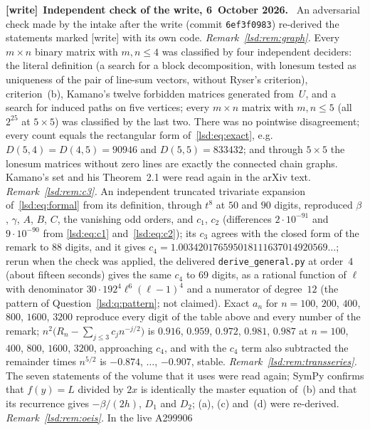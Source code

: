 \documentclass[11pt]{article}
\theoremstyle{remark}\newtheorem{remark}{Remark}
\newcommand{\file}[1]{\nolinkurl{#1}}
\newenvironment{writenote}[1][]{\par\smallskip\begingroup\small
 \noindent\textbf{[write]}\if\relax\detokenize{#1}\relax\else~\textbf{#1.}\fi\ }%
 {\par\endgroup\smallskip}
\begin{document}
\begin{writenote}[Independent check of the write, 6~October 2026]
An adversarial check made by the intake after the write (commit
\file{6ef3f0983}) re-derived the statements marked [write] with its own code.
\emph{Remark~\ref{lsd:rem:graph}.} Every $m\times n$ binary matrix with
$m,n\le4$ was classified by four independent deciders: the literal definition
(a search for a block decomposition, with lonesum tested as uniqueness of the
pair of line-sum vectors, without Ryser's criterion), criterion~(b), Kamano's
twelve forbidden matrices generated from~$U$, and a search for induced paths
on five vertices; every $m\times n$ matrix with $m,n\le5$ (all $2^{25}$ at
$5\times5$) was classified by the last two. There was no pointwise
disagreement; every count equals the rectangular form
of~\eqref{lsd:eq:exact}, e.g.\ $D(5,4)=D(4,5)=90946$ and $D(5,5)=833432$; and
through $5\times5$ the lonesum matrices without zero lines are exactly the
connected chain graphs. Kamano's set and his Theorem~2.1 were read again in
the arXiv text. \emph{Remark~\ref{lsd:rem:c3}.} An independent truncated
trivariate expansion of~\eqref{lsd:eq:formal} from its definition, through
$t^8$ at $50$ and $90$ digits, reproduced $\beta$, $\gamma$, $A$, $B$, $C$, the
vanishing odd orders, and $c_1$, $c_2$ (differences $2\cdot10^{-91}$ and
$9\cdot10^{-90}$ from \eqref{lsd:eq:c1} and~\eqref{lsd:eq:c2}); its $c_3$
agrees with the closed form of the remark to 88 digits, and it gives
$c_4=1.003420176595018111637014920569\ldots$; rerun when the check was
applied, the delivered \file{derive_general.py} at order~$4$ (about fifteen
seconds) gives the same $c_4$ to 69 digits, as a rational function of $\ell$
with denominator $30\cdot192^4\ell^6(\ell-1)^4$ and a numerator of
degree~$12$ (the pattern of Question~\ref{lsd:q:pattern}; not claimed).
Exact $a_n$ for $n=100$, $200$, $400$, $800$, $1600$, $3200$ reproduce every
digit of the table above and every number of the remark;
$n^2\bigl(R_n-\sum_{j\le3}c_jn^{-j/2}\bigr)$ is $0.916$, $0.959$, $0.972$,
$0.981$, $0.987$ at $n=100$, $400$, $800$, $1600$, $3200$, approaching $c_4$,
and with the $c_4$ term also subtracted the remainder times $n^{5/2}$ is
$-0.874$, $\dots$, $-0.907$, stable. \emph{Remark~\ref{lsd:rem:transseries}.}
The seven statements of the volume that it uses were read again; SymPy
confirms that $f(y)=L$ divided by $2x$ is identically the master equation
of~(b) and that its recurrence gives $-\beta/(2h)$, $D_1$ and $D_2$; (a), (c)
and~(d) were re-derived. \emph{Remark~\ref{lsd:rem:oeis}.} In the live A299906

\end{writenote}
\end{document}
